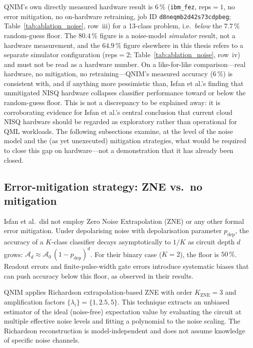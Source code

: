 \documentclass[11pt,a4paper, english]{book}
\theoremstyle{plain}
\theoremstyle{definition}
\numberwithin{equation}{chapter}
\numberwithin{figure}{chapter}
\numberwithin{table}{chapter}
\begin{document}
QNIM's own directly measured hardware result is $6\,\%$ (\texttt{ibm\_fez},
reps$=1$, no error mitigation, no on-hardware retraining, job ID
\texttt{d8neqmb2d42s73cdpbeg}; Table~\ref{tab:ablation_noise}, row~iii) for a
13-class problem, i.e.\ \emph{below} the $7.7\,\%$ random-guess floor. The
$80.4\,\%$ figure is a noise-model \emph{simulator} result, not a hardware
measurement, and the $64.9\,\%$ figure elsewhere in this thesis refers to a
separate simulator configuration (reps$=2$; Table~\ref{tab:ablation_noise},
row~iv) and must not be read as a hardware number. On a like-for-like
comparison---real hardware, no mitigation, no retraining---QNIM's measured
accuracy ($6\,\%$) is consistent with, and if anything more pessimistic than,
Isfan et al.'s finding that unmitigated NISQ hardware collapses classifier
performance toward or below the random-guess floor. This is not a
discrepancy to be explained away: it is corroborating evidence for Isfan et
al.'s central conclusion that current cloud NISQ hardware should be regarded
as exploratory rather than operational for QML workloads. The following
subsections examine, at the level of the noise model and the (as yet
unexecuted) mitigation strategies, what would be required to close this gap
on hardware---not a demonstration that it has already been closed.

\subsection{Error-mitigation strategy: ZNE vs.\ no mitigation}

Isfan et al.\ did not employ Zero Noise Extrapolation (ZNE) or any other
formal error mitigation. Under depolarising noise with depolarisation parameter
$p_\mathrm{dep}$, the accuracy of a $K$-class classifier decays asymptotically
to $1/K$ as circuit depth $d$ grows:
$\mathcal{A}_d \approx \mathcal{A}_0 \, (1 - p_\mathrm{dep})^d$.
For their binary case ($K=2$), the floor is $50\,\%$. Readout errors and
finite-pulse-width gate errors introduce systematic biases that can push accuracy
below this floor, as observed in their results.

QNIM applies Richardson extrapolation-based ZNE with order $K_\mathrm{ZNE} = 3$
and amplification factors $\{\lambda_i\} = \{1, 2.5, 5\}$. This technique extracts
an unbiased estimator of the ideal (noise-free) expectation value by evaluating
the circuit at multiple effective noise levels and fitting a polynomial to the
noise scaling. The Richardson reconstruction is model-independent and does not
assume knowledge of specific noise channels.
\end{document}
